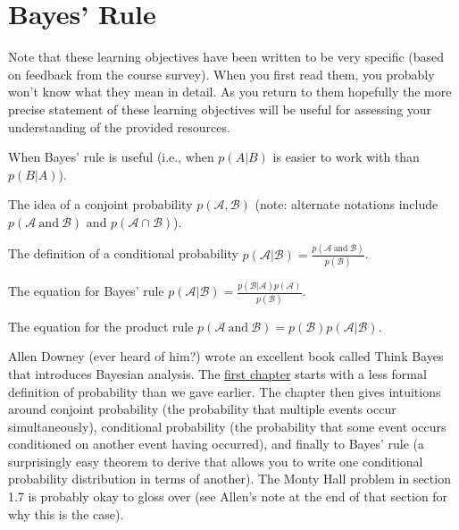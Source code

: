 \documentclass[assignment01_Solutions]{subfiles}
\begin{document}
\section{Bayes' Rule}

\begin{externalresources}[(75 minutes)]
\begin{learningobjectives}
Note that these learning objectives have been written to be very specific (based on feedback from the course survey).  When you first read them, you probably won't know what they mean in detail.  As you return to them hopefully the more precise statement of these learning objectives will be useful for assessing your understanding of the provided resources.

\bi
\item When Bayes' rule is useful (i.e., when $p(A|B)$ is easier to work with than $p(B|A)$).
\item The idea of a conjoint probability $p(\mathcal{A}, \mathcal{B})$ (note: alternate notations include $p(\mathcal{A}~\mbox{and}~\mathcal{B})$ and $p(\mathcal{A} \cap \mathcal{B})$).
\item The definition of a conditional probability $p(\mathcal{A} | \mathcal{B}) = \frac{p(\mathcal{A}~\mbox{and}~\mathcal{B})}{p(\mathcal{B})}$.
\item The equation for Bayes' rule $p(\mathcal{A} | \mathcal{B}) = \frac{p(\mathcal{B} | \mathcal{A}) p(\mathcal{A})}{p(\mathcal{B})}$.
\item The equation for the product rule $p(\mathcal{A}~\mbox{and}~\mathcal{B}) = p(\mathcal{B}) p(\mathcal{A} | \mathcal{B})$.
\ei
\end{learningobjectives}

Allen Downey (ever heard of him?) wrote an excellent book called Think Bayes that introduces Bayesian analysis.  The \href{http://www.greenteapress.com/thinkbayes/html/thinkbayes002.html}{first chapter} starts with a less formal definition of probability than we gave earlier.  The chapter then gives intuitions around conjoint probability (the probability that multiple events occur simultaneously), conditional probability (the probability that some event occurs conditioned on another event having occurred), and finally to Bayes' rule (a surprisingly easy theorem to derive that allows you to write one conditional probability distribution in terms of another).  The Monty Hall problem in section 1.7 is probably okay to gloss over (see Allen's note at the end of that section for why this is the case).


\end{externalresources}
\end{document}
